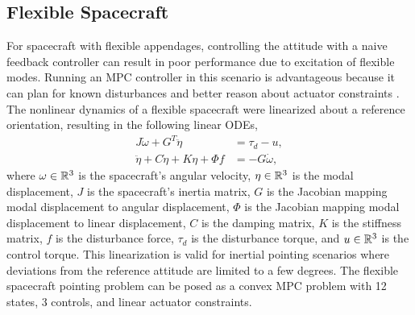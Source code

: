 \documentclass[../root.tex]{subfiles}
\begin{document}


\subsection{Flexible Spacecraft}
For spacecraft with flexible appendages, controlling the attitude with a
naive feedback controller can result in poor performance due to excitation of
flexible modes. Running an MPC controller in this scenario is advantageous
because it can plan for known disturbances and better reason about actuator
constraints \cite{tracy_ModelPredictive_2020}. The nonlinear dynamics of a flexible spacecraft
\cite{likins_Results_1971} were linearized about a reference orientation, resulting in
the following linear ODEs,
\begin{equation}
\begin{aligned}
    J \dot{\omega} + G^T \ddot{\eta}  &= \tau_d - u , \\
    \ddot{\eta} + C \dot{\eta} + K \eta + \Phi f&= -G \dot{\omega}, \label{eq:eom_mid}
\end{aligned}
\end{equation}
where $\omega \in \mathbb{R}^{3}$ is the spacecraft's angular velocity, $\eta \in \mathbb{R}^{3}$
is the modal displacement, $J$ is the spacecraft's inertia matrix, $G$ is the
Jacobian mapping modal displacement to angular displacement, $\Phi$ is the
Jacobian mapping modal displacement to linear displacement, $C$ is the
damping matrix, $K$ is the stiffness matrix, $f$ is the disturbance force,
$\tau_d$ is the disturbance torque, and $u \in \mathbb{R}^{3}$ is the control torque.
This linearization is valid for inertial pointing scenarios where deviations
from the reference attitude are limited to a few degrees. The flexible
spacecraft pointing problem can be posed as a convex MPC problem with 12
states, 3 controls, and linear actuator constraints.
\end{document}
